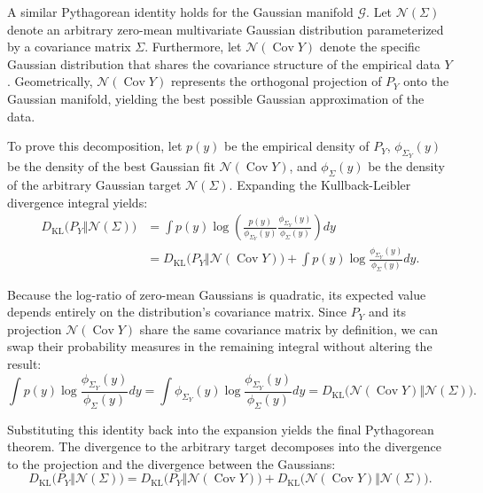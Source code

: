 \documentclass[12pt,a4paper,twoside,openany]{book}
\begin{document}
A similar Pythagorean identity holds for the Gaussian manifold $\mathcal{G}$. 
Let $\mathcal{N}(\Sigma)$ denote an arbitrary zero-mean multivariate Gaussian distribution parameterized by a covariance matrix $\Sigma$. 
Furthermore, let $\mathcal{N}(\operatorname{Cov} Y)$ denote the specific Gaussian distribution that shares the covariance structure 
of the empirical data $Y$. Geometrically, $\mathcal{N}(\operatorname{Cov} Y)$ represents the orthogonal projection of $P_Y$ onto the 
Gaussian manifold, yielding the best possible Gaussian approximation of the data. 

To prove this decomposition, let $p(y)$ be the empirical density of $P_Y$, $\phi_{\Sigma_Y}(y)$ be the density of 
the best Gaussian fit $\mathcal{N}(\operatorname{Cov} Y)$, and $\phi_{\Sigma}(y)$ be the density of the arbitrary Gaussian target $\mathcal{N}(\Sigma)$. 
Expanding the Kullback-Leibler divergence integral yields:
\begin{align}
    D_{\mathrm{KL}}\big(P_Y \Vert \mathcal{N}(\Sigma)\big) &= \int p(y) \log \left( \frac{p(y)}{\phi_{\Sigma_Y}(y)} \frac{\phi_{\Sigma_Y}(y)}{\phi_{\Sigma}(y)} \right) dy \nonumber \\
    &= D_{\mathrm{KL}}\big(P_Y \Vert \mathcal{N}(\operatorname{Cov} Y)\big) + \int p(y) \log \frac{\phi_{\Sigma_Y}(y)}{\phi_{\Sigma}(y)} dy.
\end{align}

Because the log-ratio of zero-mean Gaussians is quadratic, its expected value depends entirely on the distribution's covariance matrix. 
Since $P_Y$ and its projection $\mathcal{N}(\operatorname{Cov} Y)$ share the same covariance matrix by definition, 
we can swap their probability measures in the remaining integral without altering the result:
\begin{equation}
    \int p(y) \log \frac{\phi_{\Sigma_Y}(y)}{\phi_{\Sigma}(y)} dy = \int \phi_{\Sigma_Y}(y) \log \frac{\phi_{\Sigma_Y}(y)}{\phi_{\Sigma}(y)} dy = D_{\mathrm{KL}}\big(\mathcal{N}(\operatorname{Cov} Y) \Vert \mathcal{N}(\Sigma)\big).
\end{equation}

Substituting this identity back into the expansion yields the final Pythagorean theorem. 
The divergence to the arbitrary target decomposes into the divergence to the projection and the divergence between the Gaussians:
\begin{equation}\label{eq:pythagoras_gaussian}
    D_{\mathrm{KL}}\big(P_Y \Vert \mathcal{N}(\Sigma)\big) = D_{\mathrm{KL}}\big(P_Y \Vert \mathcal{N}(\operatorname{Cov} Y)\big) + D_{\mathrm{KL}}\big(\mathcal{N}(\operatorname{Cov} Y) \Vert \mathcal{N}(\Sigma)\big).
\end{equation}
\end{document}
